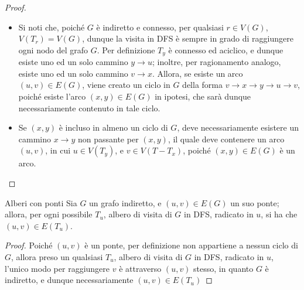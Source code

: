 \documentclass[a4paper, 12pt]{report}
\begin{document}
    \begin{proof}
        \hspace{0.7cm}
        \begin{itemize}
            \item[]  Si noti che, poiché $G$ è indiretto e connesso, per qualsiasi $r \in V(G)$, $V(T_r) = V(G)$, dunque la visita in DFS è sempre in grado di raggiungere ogni nodo del grafo $G$.
                Per definizione $T_y$ è connesso ed aciclico, e dunque esiste uno ed un solo cammino $y \rightarrow u$; inoltre, per ragionamento analogo, esiste uno ed un solo cammino $v \rightarrow x$. Allora, se esiste un arco $(u, v) \in E(G)$, viene creato un ciclo in $G$ della forma $v \rightarrow x \rightarrow y \rightarrow u \rightarrow v$, poiché esiste l'arco $(x, y) \in E(G)$ in ipotesi, che sarà dunque necessariamente contenuto in tale ciclo.
            \item[]   Se $(x, y)$ è incluso in almeno un ciclo di $G$, deve necessariamente esistere un cammino $x \rightarrow y$ non passante per $(x, y)$, il quale deve contenere un arco $(u, v)$, in cui $u \in V(T_y)$, e $v \in V(T - T_x)$, poiché $(x, y) \in E(G)$ è un arco.

        \end{itemize}
    \end{proof}

    \begin{framedlem}{Alberi con ponti}
        Sia $G$ un grafo indiretto, e $(u, v) \in E(G)$ un suo ponte; allora, per ogni possibile $T_u$, albero di visita di $G$ in DFS, radicato in $u$, si ha che $(u, v) \in E(T_u)$.
    \end{framedlem}

    \begin{proof}
        Poiché $(u, v)$ è un ponte, per definizione non appartiene a nessun ciclo di $G$, allora preso un qualsiasi $T_u$, albero di visita di $G$ in DFS, radicato in $u$, l'unico modo per raggiungere $v$ è attraverso $(u, v)$ stesso, in quanto $G$ è indiretto, e dunque necessariamente $(u, v) \in E(T_u)$
    \end{proof}
\end{document}
